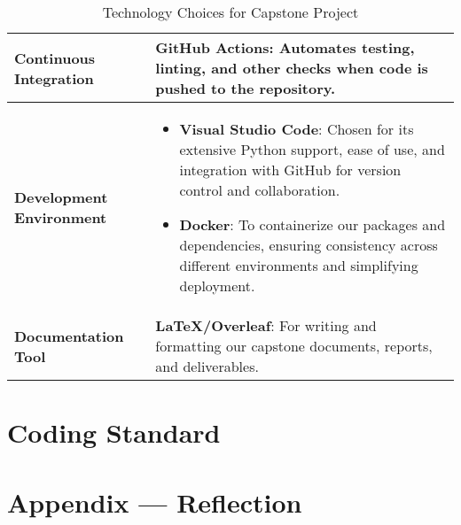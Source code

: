 \documentclass{article}
\begin{document}
\begin{table}[h!]
\begin{tabularx}{\textwidth}{| >{\raggedright\arraybackslash}m{3.5cm} | >{\raggedright\arraybackslash}X |}
        \textbf{Continuous Integration} & \textbf{GitHub Actions}: Automates testing, linting, and other checks when code is pushed to the repository. \\ \hline
        \textbf{Development Environment} & \begin{itemize}
          \item \textbf{Visual Studio Code}: Chosen for its extensive Python support, ease of use, and integration with GitHub for version control and collaboration.
          \item \textbf{Docker}: To containerize our packages and dependencies, ensuring consistency across different environments and simplifying deployment.
      \end{itemize}\\ \hline
        \textbf{Documentation Tool} & \textbf{LaTeX/Overleaf}: For writing and formatting our capstone documents, reports, and deliverables. \\ \hline
    \end{tabularx}
    \caption{Technology Choices for Capstone Project}
\end{table}

\section{Coding Standard}


\newpage{}

\section*{Appendix --- Reflection}

\end{document}
